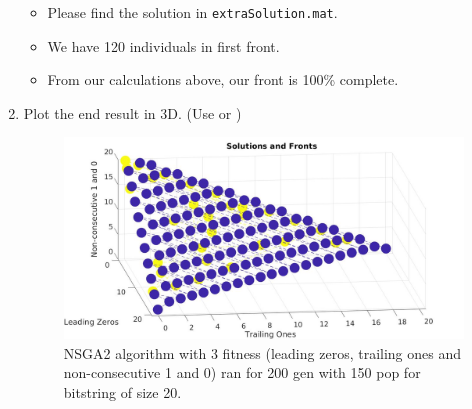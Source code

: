 \documentclass{article}
\begin{document}
\begin{enumerate}
        \color{blue}
        \begin{itemize}
            \item Please find the solution in \texttt{extraSolution.mat}.
            \item We have 120 individuals in first front. 
            \item From our calculations above, our front is 100\% complete.
        \end{itemize}
        \color{black}
	\item Plot the end result in 3D. (Use  or )
        \begin{figure}[htpb]
            \centering
            \includegraphics[width=1.0\linewidth]{3dextraQuestion.jpg}
            \caption{NSGA2 algorithm with 3 fitness (leading zeros, trailing ones and non-consecutive 1 and 0) ran for 200 gen with 150 pop for bitstring of size 20.}\label{fig:3dplot}
        \end{figure}
\end{enumerate}
\end{document}
